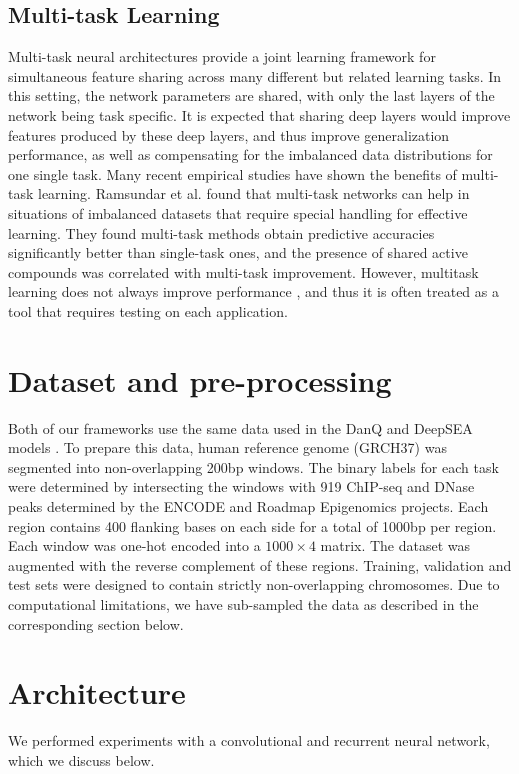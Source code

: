 \documentclass{article}
\begin{document}
\subsection{Multi-task Learning}
Multi-task neural architectures provide a joint learning framework for simultaneous feature sharing across many different but related learning tasks. In this setting, the network parameters are shared, with only the last layers of the network being task specific. It is expected that sharing deep layers would improve features produced by these deep layers, and thus improve generalization performance, as well as compensating for the imbalanced data distributions for one single task. Many recent empirical studies have shown the benefits of multi-task learning. Ramsundar et al. \cite{ramsundar2015massively} found that multi-task networks can help in situations of imbalanced datasets that require special handling for effective learning. They found multi-task methods obtain predictive accuracies significantly better than single-task ones, and the presence of shared active compounds was correlated with multi-task improvement.  However, multitask learning does not always improve performance \cite{caruana1998multitask}, and thus it is often treated as a tool that requires testing on each application.

\section{Dataset and pre-processing}
Both of our frameworks use the same data used in the DanQ and DeepSEA models \cite{quang2016danq} \cite{zhou2015predicting}. To prepare this data, human reference genome (GRCH37) was segmented into non-overlapping 200bp windows. The binary labels for each task were determined by intersecting the windows with 919 ChIP-seq and DNase peaks determined by the ENCODE \cite{encode2012integrated} and Roadmap Epigenomics \cite{kundaje2015integrative} projects. Each region contains 400 flanking bases on each side for a total of 1000bp per region. Each window was one-hot encoded into a $1000 \times 4$ matrix. The dataset was augmented with the reverse complement of these regions.  Training, validation and test sets were designed to contain strictly non-overlapping chromosomes.  Due to computational limitations, we have sub-sampled the data as described in the corresponding section below.

\section{Architecture}
We performed experiments with a convolutional and recurrent neural network, which we discuss below.
\end{document}
